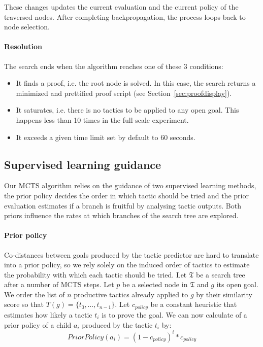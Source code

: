 \documentclass[runningheads,a4paper,draft]{svjour3}
\begin{document}
These changes updates the current evaluation and the current policy of the
traversed nodes.
After completing backpropagation, the process loops back to node
selection.

\paragraph{Resolution}
The search ends when the algorithm reaches one of these 3 conditions:
\begin{itemize}
\item It finds a proof, i.e. the root node is solved. In this case,
the search returns a minimized and
prettified proof script (see Section~\ref{sec:proofdisplay}).
\item It saturates, i.e. there is no tactics to be applied to any open goal.
This happens less than 10 times in the full-scale experiment.
\item It exceeds a given time limit set by default to 60 seconds.
\end{itemize}

\subsection{Supervised learning guidance}
Our MCTS algorithm relies on the guidance of two supervised learning methods,
the prior policy decides the order in which tactic should be tried and the
prior evaluation estimates if a branch is fruitful by analysing tactic
outputs. Both priors influence the rates at which branches of the search tree
are explored.

\paragraph{Prior policy}\label{sec:policy}
Co-distances between goals produced by the tactic predictor are hard
to translate into a prior policy, so we rely solely on the induced order of
tactics to estimate the probability with which each tactic should be tried.
Let $\mathfrak{T}$ be a search tree after a number of MCTS steps.
Let $p$ be a selected node in $\mathfrak{T}$ and $g$ its open goal. We order
the list of $n$ productive tactics already
applied to $g$ by their similarity score so that $T(g)= \lbrace
t_0,\ldots,t_{n-1} \rbrace$.
Let $c_{policy}$ be a constant heuristic that estimates how likely a tactic
$t_i$ is to prove the goal.
We can now calculate of a prior policy of a child $a_i$ produced by the tactic
$t_i$ by:
\[PriorPolicy(a_i) = (1 - c_{policy})^{i} * c_{policy}\]
\end{document}
